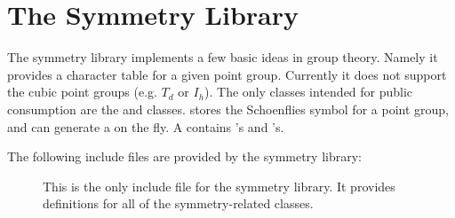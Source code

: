 
\chapter{The Symmetry Library}

The symmetry library implements a few basic ideas in group theory.  Namely
it provides a character table for a given point group.  Currently it does
not support the cubic point groups (e.g. $T_d$ or $I_h$).  The only classes
intended for public consumption are the  and
 classes.   stores the
Schoenflies symbol for a point group, and can generate a
 on the fly.  A  contains
's and 's.

The following include files are provided by the symmetry library:

\begin{description}
\item[]
This is the only include file for the symmetry library.  It provides
definitions for all of the symmetry-related classes.
\end{description}






